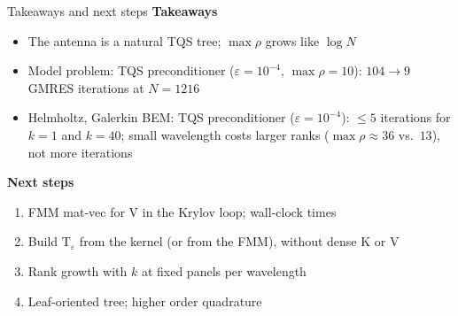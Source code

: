 \documentclass[aspectratio=169,11pt]{beamer}
\begin{document}
\begin{frame}{Takeaways and next steps}
\small
\textbf{Takeaways}
\begin{itemize}
\item The antenna is a natural TQS tree; $\max\rho$ grows like $\log N$
\item Model problem: TQS preconditioner ($\varepsilon=10^{-4}$, $\max\rho=10$): $104\to9$ GMRES iterations at $N=1216$
\item Helmholtz, Galerkin BEM: TQS preconditioner ($\varepsilon=10^{-4}$): $\le5$ iterations for $k=1$ and $k=40$;
  small wavelength costs larger ranks ($\max\rho\approx36$ vs.\ $13$), not more iterations
\end{itemize}
\textbf{Next steps}
\begin{enumerate}
\item FMM mat-vec for $\mathrm{V}$ in the Krylov loop; wall-clock times
\item Build $\mathrm{T}_\varepsilon$ from the kernel (or from the FMM), without dense $\mathrm{K}$ or $\mathrm{V}$
\item Rank growth with $k$ at fixed panels per wavelength
\item Leaf-oriented tree; higher order quadrature
\end{enumerate}
\end{frame}
\end{document}

